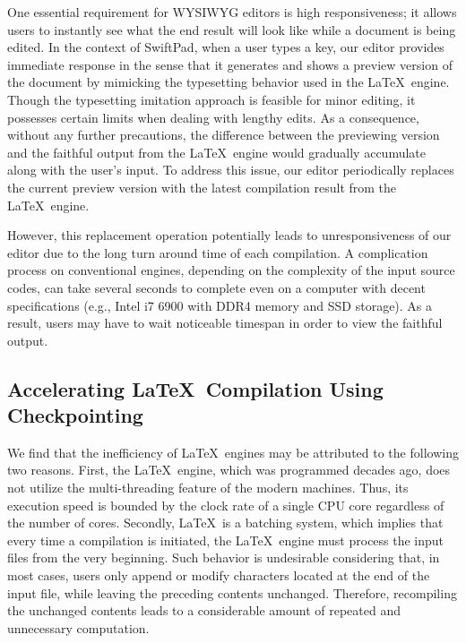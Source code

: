 \documentclass[]{sigchi}
\begin{document}
One essential requirement for WYSIWYG editors is high responsiveness; it allows users to instantly see what the end result will look like while a document is being  edited. In the context of SwiftPad, when a user types a key, our editor provides immediate response in the sense that it generates and shows a preview version of the document by mimicking the typesetting behavior used in the \LaTeX\ engine. 
Though the typesetting imitation approach is feasible for minor editing, it possesses certain limits when dealing with lengthy edits.
As a consequence, without any further precautions, the difference between the previewing version and the faithful output from the \LaTeX\ engine would gradually accumulate along with the user's input. To address this issue, our editor periodically replaces the current preview version with the latest compilation result from the \LaTeX\ engine.

However, this replacement operation potentially leads to unresponsiveness of our editor due to the long turn around time of each compilation.
 A complication process on conventional engines, depending on the complexity of the input source codes, can take several seconds to complete even on a computer with decent specifications (e.g., Intel i7 6900 with DDR4 memory and SSD storage). As a result, users may have to wait noticeable timespan in order to view the faithful output.

\subsection{Accelerating \LaTeX\ Compilation Using Checkpointing}
We find that the inefficiency of \LaTeX\ engines may be attributed to the following two reasons.
First, the \LaTeX\ engine, which was programmed decades ago, does not utilize the multi-threading feature of the modern machines. Thus, its execution speed is bounded by the clock rate of a single CPU core regardless of the number of cores.
Secondly, \LaTeX\ is a batching system, which implies that every time a compilation is initiated, the \LaTeX\ engine must process the input files from the very beginning. Such behavior is undesirable considering that, in most cases, users only append or modify characters located at the end of the input file, while leaving the preceding contents unchanged. Therefore, recompiling the unchanged contents leads to a considerable amount of repeated and unnecessary computation. 
\end{document}
